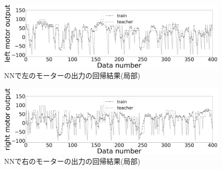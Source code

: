 \vspace{-7mm}
\begin{figure}[!ht]
    \centering
    \includegraphics[width=1.0\linewidth]{LeftOutput.eps}
    \caption{NNで左のモーターの出力の回帰結果(局部)}
    \label{LeftOutput}
\end{figure}

\vspace{-7mm}
\begin{figure}[!ht]
    \centering
    \includegraphics[width=1.0\linewidth]{rightOutput.eps}
    \caption{NNで右のモーターの出力の回帰結果(局部)}
    \label{rightOutput}
\end{figure}
